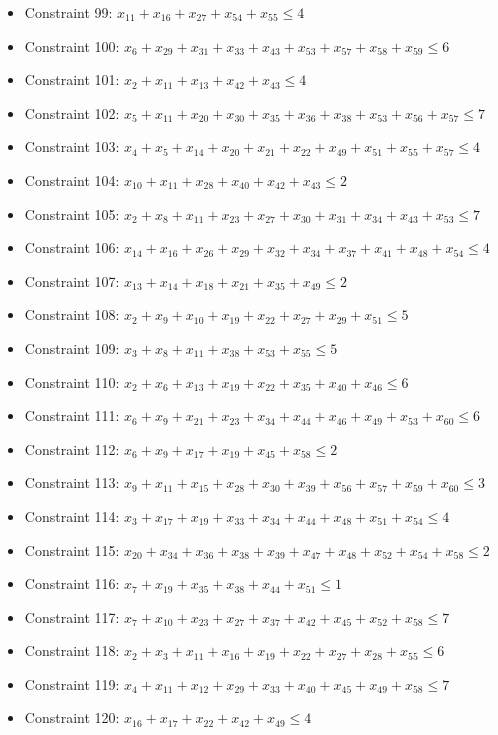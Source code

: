 \documentclass[11pt]{article}
\begin{document}
\begin{itemize}
\item Constraint 99: $x_{11} + x_{16} + x_{27} + x_{54} + x_{55} \le 4$
\item Constraint 100: $x_{6} + x_{29} + x_{31} + x_{33} + x_{43} + x_{53} + x_{57} + x_{58} + x_{59} \le 6$
\item Constraint 101: $x_{2} + x_{11} + x_{13} + x_{42} + x_{43} \le 4$
\item Constraint 102: $x_{5} + x_{11} + x_{20} + x_{30} + x_{35} + x_{36} + x_{38} + x_{53} + x_{56} + x_{57} \le 7$
\item Constraint 103: $x_{4} + x_{5} + x_{14} + x_{20} + x_{21} + x_{22} + x_{49} + x_{51} + x_{55} + x_{57} \le 4$
\item Constraint 104: $x_{10} + x_{11} + x_{28} + x_{40} + x_{42} + x_{43} \le 2$
\item Constraint 105: $x_{2} + x_{8} + x_{11} + x_{23} + x_{27} + x_{30} + x_{31} + x_{34} + x_{43} + x_{53} \le 7$
\item Constraint 106: $x_{14} + x_{16} + x_{26} + x_{29} + x_{32} + x_{34} + x_{37} + x_{41} + x_{48} + x_{54} \le 4$
\item Constraint 107: $x_{13} + x_{14} + x_{18} + x_{21} + x_{35} + x_{49} \le 2$
\item Constraint 108: $x_{2} + x_{9} + x_{10} + x_{19} + x_{22} + x_{27} + x_{29} + x_{51} \le 5$
\item Constraint 109: $x_{3} + x_{8} + x_{11} + x_{38} + x_{53} + x_{55} \le 5$
\item Constraint 110: $x_{2} + x_{6} + x_{13} + x_{19} + x_{22} + x_{35} + x_{40} + x_{46} \le 6$
\item Constraint 111: $x_{6} + x_{9} + x_{21} + x_{23} + x_{34} + x_{44} + x_{46} + x_{49} + x_{53} + x_{60} \le 6$
\item Constraint 112: $x_{6} + x_{9} + x_{17} + x_{19} + x_{45} + x_{58} \le 2$
\item Constraint 113: $x_{9} + x_{11} + x_{15} + x_{28} + x_{30} + x_{39} + x_{56} + x_{57} + x_{59} + x_{60} \le 3$
\item Constraint 114: $x_{3} + x_{17} + x_{19} + x_{33} + x_{34} + x_{44} + x_{48} + x_{51} + x_{54} \le 4$
\item Constraint 115: $x_{20} + x_{34} + x_{36} + x_{38} + x_{39} + x_{47} + x_{48} + x_{52} + x_{54} + x_{58} \le 2$
\item Constraint 116: $x_{7} + x_{19} + x_{35} + x_{38} + x_{44} + x_{51} \le 1$
\item Constraint 117: $x_{7} + x_{10} + x_{23} + x_{27} + x_{37} + x_{42} + x_{45} + x_{52} + x_{58} \le 7$
\item Constraint 118: $x_{2} + x_{3} + x_{11} + x_{16} + x_{19} + x_{22} + x_{27} + x_{28} + x_{55} \le 6$
\item Constraint 119: $x_{4} + x_{11} + x_{12} + x_{29} + x_{33} + x_{40} + x_{45} + x_{49} + x_{58} \le 7$
\item Constraint 120: $x_{16} + x_{17} + x_{22} + x_{42} + x_{49} \le 4$
\end{itemize}
\end{document}
